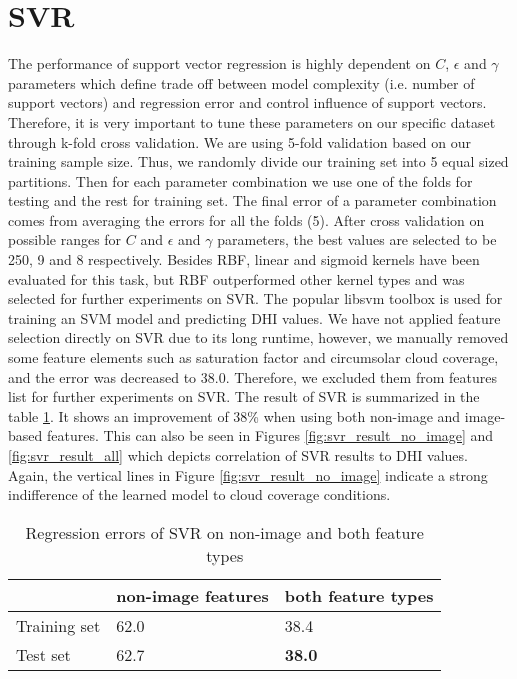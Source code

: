 \section{SVR}
The performance of support vector regression is highly dependent on $C$, $\epsilon$ and $\gamma$ parameters which define trade off between model complexity (i.e. number of support vectors) and regression error and control influence of support vectors. Therefore, it is very important to tune these parameters on our specific dataset through k-fold cross validation. We are using 5-fold validation based on our training sample size. Thus, we randomly divide our training set into 5 equal sized partitions. Then for each parameter combination we use one of the folds for testing and the rest for training set. The final error of a parameter combination comes from averaging the errors for all the folds (5). After cross validation on possible ranges for $C$ and $\epsilon$  and $\gamma$ parameters, the best values are selected to be 250, 9 and 8 respectively. Besides RBF, linear and sigmoid kernels have been evaluated for this task, but RBF outperformed other kernel types and was selected for further experiments on SVR. The popular libsvm toolbox is used for training an SVM model and predicting DHI values. We have not applied feature selection directly on SVR due to its long runtime, however, we manually removed some feature elements such as saturation factor and circumsolar cloud coverage, and the error was decreased to 38.0. Therefore, we excluded them from features list for further experiments on SVR. The result of SVR is summarized in the table \ref{table:rmse_svr}. It shows an improvement of 38\% when using both non-image and image-based features. This can also be seen in Figures \ref{fig:svr_result_no_image} and \ref{fig:svr_result_all} which depicts correlation of SVR results to DHI values. Again, the vertical lines in Figure \ref{fig:svr_result_no_image} indicate a strong indifference of the learned model to cloud coverage conditions.

\begin{table}[h!]
\centering
\begin{tabular}{ |p{2.5cm}||p{4cm}|p{4cm}|  }
 \hline
 &non-image features& both feature types\\
 \hline
 Training set &   62.0  & 38.4 \\
 Test set&   62.7  & \textbf{38.0} \\
 \hline
\end{tabular}
\caption{Regression errors of SVR on non-image and both feature types}
\label{table:rmse_svr}
\end{table}

